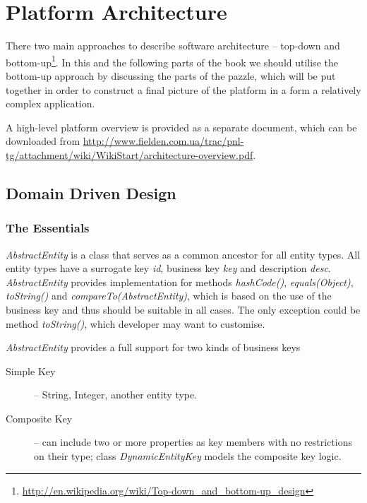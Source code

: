 \chapter{Platform Architecture}\label{ch01:01}

  There two main approaches to describe software architecture -- top-down and bottom-up\footnote{\url{http://en.wikipedia.org/wiki/Top-down_and_bottom-up_design}}.
  In this and the following parts of the book we should utilise the bottom-up approach by discussing the parts of the pazzle, which will be put together in order to construct a final picture of the platform in a form a relatively complex application.

  A high-level platform overview is provided as a separate document, which can be downloaded from \url{http://www.fielden.com.ua/trac/pnl-tg/attachment/wiki/WikiStart/architecture-overview.pdf}.

\section{Domain Driven Design}
 
\subsection{The Essentials}

  \emph{AbstractEntity} is a class that serves as a common ancestor for all entity types. 
  All entity types have a surrogate key \emph{id}, business key \emph{key} and description \emph{desc}. 
  \emph{AbstractEntity} provides implementation for methods \emph{hashCode()}, \emph{equals(Object)}, \emph{toString()} and \emph{compareTo(AbstractEntity)}, which is based on the use of the business key and thus should be suitable in all cases.
  The only exception could be method \emph{toString()}, which developer may want to customise.


  \emph{AbstractEntity} provides a full support for two kinds of business keys
  \begin{description}
    \item[Simple Key] -- String, Integer, another entity type.
    \item[Composite Key] -- can include two or more properties as key members with no restrictions on their type; class \emph{DynamicEntityKey} models the composite key logic.
   \end{description}

